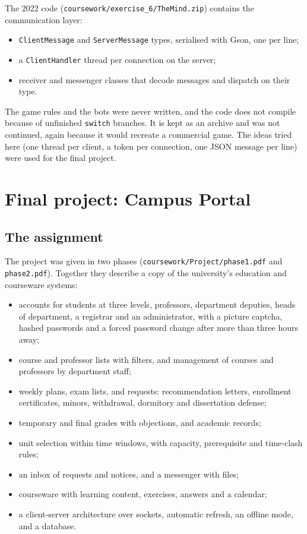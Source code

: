 \documentclass[11pt,a4paper]{article}
\begin{document}
The 2022 code (\texttt{coursework/exercise\_6/TheMind.zip}) contains the communication layer:
\begin{itemize}
\item \texttt{ClientMessage} and \texttt{ServerMessage} types, serialised with Gson, one per line;
\item a \texttt{ClientHandler} thread per connection on the server;
\item receiver and messenger classes that decode messages and dispatch on their type.
\end{itemize}
The game rules and the bots were never written, and the code does not compile because of unfinished \texttt{switch} branches. It is kept as an archive and was not continued, again because it would recreate a commercial game. The ideas tried here (one thread per client, a token per connection, one JSON message per line) were used for the final project.

\section{Final project: Campus Portal}

\subsection{The assignment}

The project was given in two phases (\texttt{coursework/Project/phase1.pdf} and \texttt{phase2.pdf}). Together they describe a copy of the university's education and courseware systems:

\begin{itemize}
\item accounts for students at three levels, professors, department deputies, heads of department, a registrar and an administrator, with a picture captcha, hashed passwords and a forced password change after more than three hours away;
\item course and professor lists with filters, and management of courses and professors by department staff;
\item weekly plans, exam lists, and requests: recommendation letters, enrollment certificates, minors, withdrawal, dormitory and dissertation defense;
\item temporary and final grades with objections, and academic records;
\item unit selection within time windows, with capacity, prerequisite and time-clash rules;
\item an inbox of requests and notices, and a messenger with files;
\item courseware with learning content, exercises, answers and a calendar;
\item a client-server architecture over sockets, automatic refresh, an offline mode, and a database.
\end{itemize}
\end{document}
